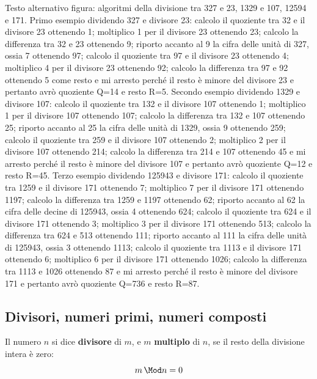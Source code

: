 \vspace{-1.5em}
\immagine
{Testo alternativo figura: algoritmi della divisione tra 
327 e 23, 1329 e 107, 12594 e 171. 
Primo esempio dividendo 327 e divisore 23: 
calcolo il quoziente tra 32 e il divisore 23 ottenendo 1; 
moltiplico 1 per il divisore 23 ottenendo 23; 
calcolo la differenza tra 32 e 23 ottenendo 9; 
riporto accanto al 9 la cifra delle unità di 327, ossia 7 ottenendo 97; 
calcolo il quoziente tra 97 e il divisore 23 ottenendo 4; 
moltiplico 4 per il divisore 23 ottenendo 92; 
calcolo la differenza tra 97 e 92 ottenendo 5 come resto e mi arresto 
perché il resto è minore del divisore 23 e pertanto avrò 
quoziente Q=14 e resto R=5. 
Secondo esempio dividendo 1329 e divisore 107: 
calcolo il quoziente tra 132 e il divisore 107 ottenendo 1; 
moltiplico 1 per il divisore 107 ottenendo 107; 
calcolo la differenza tra 132 e 107 ottenendo 25; 
riporto accanto al 25 la cifra delle unità di 1329, ossia 9 ottenendo 259; 
calcolo il quoziente tra 259 e il divisore 107 ottenendo 2; 
moltiplico 2 per il divisore 107 ottenendo 214; 
calcolo la differenza tra 214 e 107 ottenendo 45 e mi arresto perché 
il resto è minore del divisore 107 e pertanto avrò 
quoziente Q=12 e resto R=45. 
Terzo esempio dividendo 125943 e divisore 171: 
calcolo il quoziente tra 1259 e il divisore 171 ottenendo 7; 
moltiplico 7 per il divisore 171 ottenendo 1197; 
calcolo la differenza tra 1259 e 1197 ottenendo 62; 
riporto accanto al 62 la cifra delle decine di 125943, 
ossia 4 ottenendo 624; 
calcolo il quoziente tra 624 e il divisore 171 ottenendo 3; 
moltiplico 3 per il divisore 171 ottenendo 513; 
calcolo la differenza tra 624 e 513 ottenendo 111; 
riporto accanto al 111 la cifra delle unità di 125943, 
ossia 3 ottenendo 1113; 
calcolo il quoziente tra 1113 e il divisore 171 ottenendo 6; 
moltiplico 6 per il divisore 171 ottenendo 1026; 
calcolo la differenza tra 1113 e 1026 ottenendo 87 e mi arresto perché 
il resto è minore del divisore 171 e pertanto avrò 
quoziente Q=736 e resto R=87.}
{\divisintb}
\vspace{-2em}

\subsection{Divisori, numeri primi, numeri composti}


\begin{definizione}{}{}
Il numero \(n\) si dice \textbf{divisore} di \(m\), e \(m\) 
\textbf{multiplo} di \(n\), se il resto della divisione intera è zero: 
\[m\, \Mod n = 0\]
\end{definizione}

